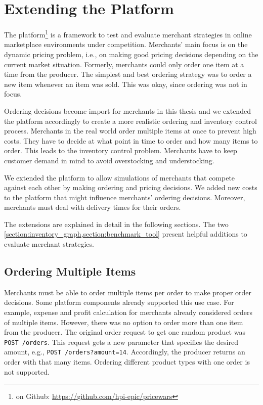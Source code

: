 
\chapter{Extending the \pricewars Platform}
\label{section:platform_extension}

The \pricewars platform\footnote{\pricewars on Github: \url{https://github.com/hpi-epic/pricewars}} is a framework to test and evaluate merchant strategies in online marketplace environments under competition.
Merchants' main focus is on the dynamic pricing problem, i.e., on making good pricing decisions depending on the current market situation.
Formerly, merchants could only order one item at a time from the producer.
The simplest and best ordering strategy was to order a new item whenever an item was sold.
This was okay, since ordering was not in focus.

Ordering decisions become import for merchants in this thesis and we extended the \pricewars platform accordingly to create a more realistic ordering and inventory control process.
Merchants in the real world order multiple items at once to prevent high costs.
They have to decide at what point in time to order and how many items to order.
This leads to the inventory control problem.
Merchants have to keep customer demand in mind to avoid overstocking and understocking.

We extended the \pricewars platform to allow simulations of merchants that compete against each other by making ordering and pricing decisions.
We added new costs to the platform that might influence merchants' ordering decisions.
Moreover, merchants must deal with delivery times for their orders.

The extensions are explained in detail in the following sections.
The two \cref{section:inventory_graph,section:benchmark_tool} present helpful additions to evaluate merchant strategies.

\section{Ordering Multiple Items}
\label{section:multiple_items}
Merchants must be able to order multiple items per order to make proper order decisions.
Some platform components already supported this use case.
For example, expense and profit calculation for merchants already considered orders of multiple items.
However, there was no option to order more than one item from the producer.
The original order request to get one random product was \texttt{POST /orders}.
This request gets a new parameter that specifies the desired amount, e.g., \texttt{POST /orders?amount=14}.
Accordingly, the producer returns an order with that many items.
Ordering different product types with one order is not supported.

